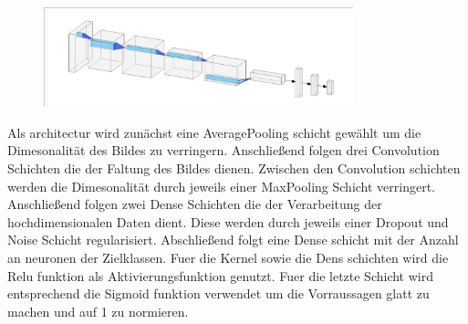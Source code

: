 \begin{figure}[h]
		\centering
		\includegraphics[width=0.8\textwidth]{pictures/architecture.pdf}
		\caption{}
		\label{fig:}
\end{figure}

Als architectur wird zunächst eine AveragePooling schicht gewählt um die
Dimesonalität des Bildes zu verringern.
Anschließend folgen drei Convolution Schichten die der Faltung des Bildes
dienen. 
Zwischen den Convolution schichten werden die Dimesonalität durch jeweils einer
MaxPooling Schicht verringert. 
Anschließend folgen zwei Dense Schichten die der Verarbeitung der
hochdimensionalen Daten dient. 
Diese werden durch jeweils einer Dropout und Noise Schicht regularisiert. 
Abschließend folgt eine Dense schicht mit der Anzahl an neuronen der
Zielklassen.
Fuer die Kernel sowie die Dens schichten wird die Relu funktion als
Aktivierungsfunktion genutzt.
Fuer die letzte Schicht wird entsprechend die Sigmoid funktion verwendet um die
Vorraussagen glatt zu machen und auf 1 zu normieren.
